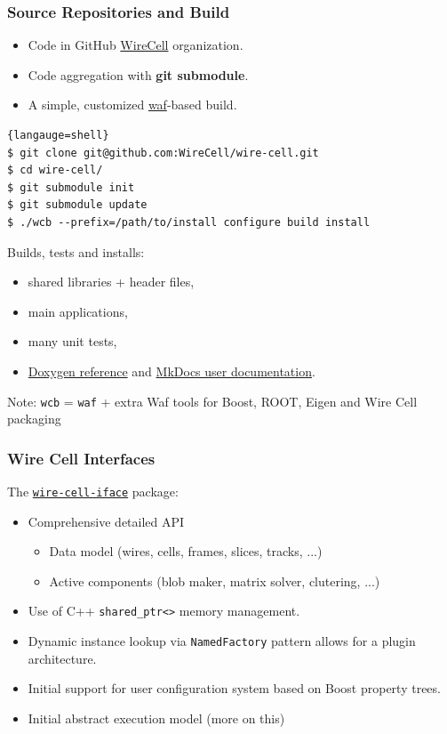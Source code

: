 \documentclass[xcolor=dvipsnames]{beamer}
\begin{document}
\begin{frame}[fragile]
  \frametitle{Source Repositories and Build}

  \begin{itemize}
  \item Code in GitHub \href{https://github.com/WireCell/}{WireCell} organization.
  \item Code aggregation with \textbf{git submodule}.
  \item A simple, customized \href{https://waf.io/}{waf}-based build.
  \end{itemize}

  \begin{lstlisting}{langauge=shell}
$ git clone git@github.com:WireCell/wire-cell.git
$ cd wire-cell/
$ git submodule init
$ git submodule update
$ ./wcb --prefix=/path/to/install configure build install
  \end{lstlisting}

  Builds, tests and installs:
  \begin{itemize}
  \item shared libraries + header files,
  \item main applications,
  \item many unit tests,
  \item \href{http://www.phy.bnl.gov/wire-cell/doxy/html/}{Doxygen reference} and \href{http://wirecell.github.io/wire-cell-docs/}{MkDocs user documentation}.
  \end{itemize}

  \scriptsize Note: \texttt{wcb} = \texttt{waf} + extra Waf tools for Boost, ROOT, Eigen
  and Wire Cell packaging
  

\end{frame}

\begin{frame}[fragile]
  \frametitle{Wire Cell Interfaces}

  The \href{https://github.com/WireCell/wire-cell-iface}{\texttt{wire-cell-iface}} package:

  \begin{itemize}
  \item Comprehensive detailed API
    \begin{itemize}
    \item Data model (wires, cells, frames, slices, tracks, ...)
    \item Active components (blob maker, matrix solver, clutering, ...)
    \end{itemize}
  \item Use of C++ \verb|shared_ptr<>| memory management.
  \item Dynamic instance lookup via \texttt{NamedFactory} pattern
    allows for a plugin architecture.
  \item Initial support for user configuration system based on Boost
    property trees.
  \item Initial abstract execution model (more on this)
  \end{itemize}
\end{frame}
\end{document}
